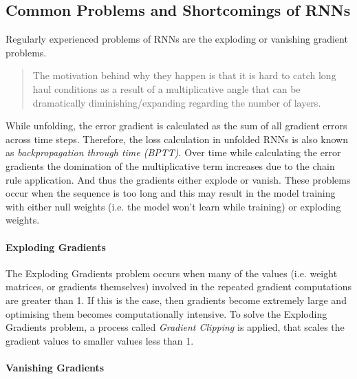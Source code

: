         \subsection{Common Problems and Shortcomings of RNNs}
        \label{sec:shortcomings-of-rnns-background}

            Regularly experienced problems of RNNs are the exploding or vanishing gradient problems.
            \begin{quote}
                The motivation behind why they happen is that it is hard to catch long haul conditions as a result of a multiplicative angle that can be dramatically diminishing/expanding regarding the number of layers. \cite{parikhDisadvantagesRNN2021}
            \end{quote}
            While unfolding, the error gradient is calculated as the sum of all gradient errors across time steps. Therefore, the loss calculation in unfolded RNNs is also known as \emph{backpropagation through time (BPTT)}.
            Over time while calculating the error gradients the domination of the multiplicative term increases due to the chain rule application. And thus the gradients either explode or vanish.
            These problems occur when the sequence is too long and this may result in the model training with either null weights (i.e. the model won't learn while training) or exploding weights.
            
            \paragraph{Exploding Gradients}
            \label{par:exploding-gradients-background}

                The Exploding Gradients problem occurs when many of the values (i.e. weight matrices, or gradients themselves) involved in the repeated gradient computations are greater than 1. 
                If this is the case, then gradients become extremely large and optimising them becomes computationally intensive.
                To solve the Exploding Gradients problem, a process called \emph{Gradient Clipping} is applied, that scales the gradient values to smaller values less than 1.


            \paragraph{Vanishing Gradients}
            \label{par:vanishing-gradients-background}

